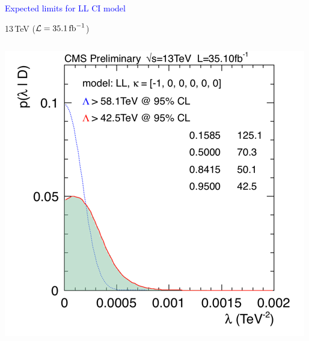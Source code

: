 \documentclass[t,professionalfonts,handout, xcolor=pdftex,dvipsnames,table]{beamer}
\begin{document}
\begin{frame}
\begin{columns}[T]
\end{columns}

\end{frame}


\begin{frame}
\textcolor{blue}{Expected limits for LL CI model} 

13\,TeV (${\cal L} = 35.1\,\textrm{fb}^{-1}$)

\medskip

\begin{columns}[T]

\begin{column}{0.49\textwidth}
\centerline{\includegraphics[width=\textwidth]{limit_c.png}}
\end{column}


\end{columns}
\end{frame}
\end{document}
